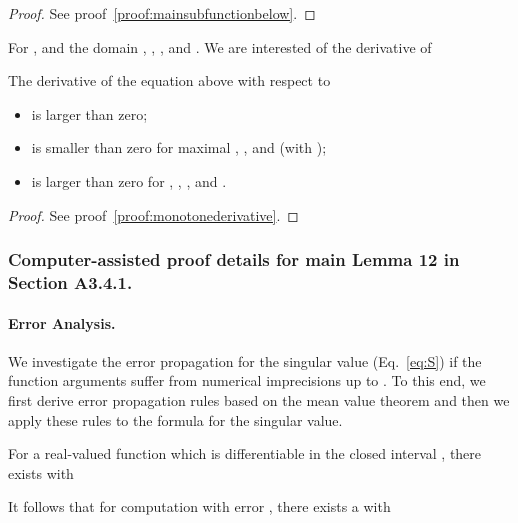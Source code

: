 \documentclass{article}
\begin{document}
\begin{proof}
See proof~\ref{proof:mainsubfunctionbelow}.
\end{proof}



\begin{lemma}
\label{th:s2monotone}
For , 
and the domain 
, 
,
, and 
.
We are interested of the derivative of


The derivative of the equation above with
respect to
\begin{itemize}
\item  is larger than zero;
\item  is smaller than zero for maximal
, , and  (with
);
\item  is larger than zero for , , , and .
\end{itemize}

\end{lemma}

\begin{proof}
See proof~\ref{proof:monotonederivative}.
\end{proof}













\subsubsection{Computer-assisted proof details for main Lemma 12 in Section A3.4.1.}
\label{sec:error}

\paragraph{Error Analysis.} We investigate the error propagation for the 
singular value (Eq.~\eqref{eq:S}) if the function arguments 
suffer from numerical imprecisions up to . To this end, we first 
derive error propagation rules based on the mean value theorem and then 
we apply these rules to the formula for the singular value.

\begin{lemma}
\label{th:mvt}
For a real-valued function  which is differentiable in the closed interval ,
there exists  with 

\end{lemma}
It follows that 
for computation with error , there exists a  with 
\end{document}
